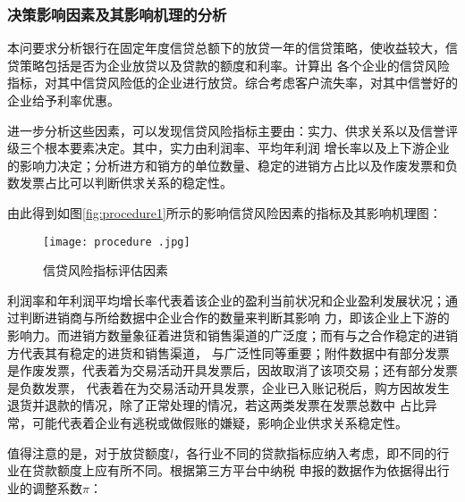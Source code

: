 \documentclass[withoutpreface,bwprint]{cumcmthesis}
\begin{document}
\subsubsection{决策影响因素及其影响机理的分析}
本问要求分析银行在固定年度信贷总额下的放贷一年的信贷策略，使收益较大，信贷策略包括是否为企业放贷以及贷款的额度和利率。计算出
各个企业的信贷风险指标，对其中信贷风险低的企业进行放贷。综合考虑客户流失率，对其中信誉好的企业给予利率优惠。

进一步分析这些因素，可以发现信贷风险指标主要由：实力、供求关系以及信誉评级三个根本要素决定。其中，实力由利润率、平均年利润
增长率以及上下游企业的影响力决定；分析进方和销方的单位数量、稳定的进销方占比以及作废发票和负数发票占比可以判断供求关系的稳定性。

由此得到如图\ref{fig:procedure1}所示的影响信贷风险因素的指标及其影响机理图：

\begin{figure}[H]
    \centering
    \texttt{[image: procedure .jpg]}
    \caption{信贷风险指标评估因素}
    \label{fig:procedure}
\end{figure}

利润率和年利润平均增长率代表着该企业的盈利当前状况和企业盈利发展状况；通过判断进销商与所给数据中企业合作的数量来判断其影响
力，即该企业上下游的影响力。而进销方数量象征着进货和销售渠道的广泛度；而有与之合作稳定的进销方代表其有稳定的进货和销售渠道，
与广泛性同等重要；附件数据中有部分发票是作废发票，代表着为交易活动开具发票后，因故取消了该项交易；还有部分发票是负数发票，
代表着在为交易活动开具发票，企业已入账记税后，购方因故发生退货并退款的情况，除了正常处理的情况，若这两类发票在发票总数中
占比异常，可能代表着企业有逃税或做假账的嫌疑，影响企业供求关系稳定性。

值得注意的是，对于放贷额度$l$，各行业不同的贷款指标应纳入考虑，即不同的行业在贷款额度上应有所不同。根据第三方平台中纳税
申报的数据\cite{dangxinlu2016}作为依据得出行业的调整系数$\pi$：
\begin{table}[!htbp]
    \caption{行业调整系数}\label{tab:002} \centering
\end{table}
\end{document}
